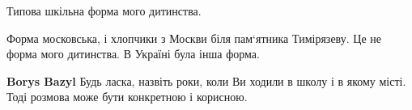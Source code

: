  
 
 
 
 
Типова шкільна форма мого дитинства.

Форма московська, і хлопчики з Москви біля пам`ятника Тимірязеву. Це не форма мого дитинства. В Україні була інша форма.

\textbf{Borys Bazyl} Будь ласка, назвіть роки, коли Ви ходили в школу і в якому місті. Тоді розмова може бути конкретною і корисною.
